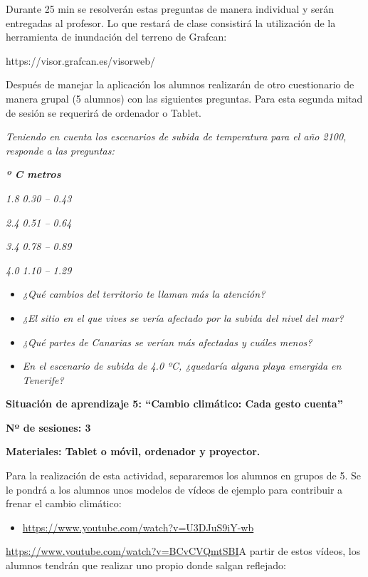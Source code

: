 \documentclass[
]{article}
\providecommand{\tightlist}{%
  \setlength{\itemsep}{0pt}\setlength{\parskip}{0pt}}
\begin{document}
Durante 25 min se resolverán estas preguntas de manera individual y
serán entregadas al profesor. Lo que restará de clase consistirá la
utilización de la herramienta de inundación del terreno de Grafcan:

https://visor.grafcan.es/visorweb/

Después de manejar la aplicación los alumnos realizarán de otro
cuestionario de manera grupal (5 alumnos) con las siguientes preguntas.
Para esta segunda mitad de sesión se requerirá de ordenador o Tablet.

\emph{Teniendo en cuenta los escenarios de subida de temperatura para el
año 2100, responde a las preguntas:}

\texttt{}\textbf{\emph{º C metros}}

\texttt{}\emph{1.8 0.30 -- 0.43}

\texttt{}\emph{2.4 0.51 -- 0.64}

\texttt{}\emph{3.4 0.78 -- 0.89}

\texttt{}\emph{4.0 1.10 -- 1.29}

\begin{itemize}
\tightlist
\item
  \emph{¿Qué cambios del territorio te llaman más la atención?}
\item
  \emph{¿El sitio en el que vives se vería afectado por la subida del
  nivel del mar?}
\item
  \emph{¿Qué partes de Canarias se verían más afectadas y cuáles menos?}
\item
  \emph{En el escenario de subida de 4.0 ºC, ¿quedaría alguna playa
  emergida en Tenerife?}
\end{itemize}

\textbf{Situación de aprendizaje 5: ``Cambio climático: Cada gesto
cuenta''}

\textbf{Nº de sesiones: 3}

\textbf{Materiales: Tablet o móvil, ordenador y proyector.}

Para la realización de esta actividad, separaremos los alumnos en grupos
de 5. Se le pondrá a los alumnos unos modelos de vídeos de ejemplo para
contribuir a frenar el cambio climático:

\begin{itemize}
\tightlist
\item
  \url{https://www.youtube.com/watch?v=U3DJuS9iY-wb}
\end{itemize}

\url{https://www.youtube.com/watch?v=BCvCVQmtSBI}A partir de estos
vídeos, los alumnos tendrán que realizar uno propio donde salgan
reflejado:
\end{document}
